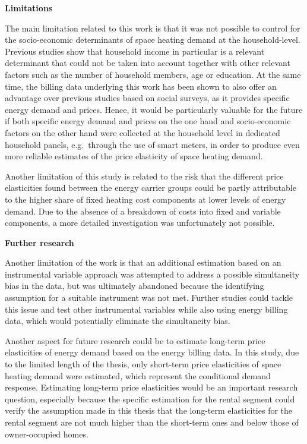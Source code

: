 \documentclass[12pt,twoside]{reedthesis}
\begin{document}
\textbf{Limitations}

The main limitation related to this work is that it was not possible to control for the socio-economic determinants of space heating demand at the household-level. Previous studies show that household income in particular is a relevant determinant that could not be taken into account together with other relevant factors such as the number of household members, age or education. At the same time, the billing data underlying this work has been shown to also offer an advantage over previous studies based on social surveys, as it provides specific energy demand and prices. Hence, it would be particularly valuable for the future if both specific energy demand and prices on the one hand and socio-economic factors on the other hand were collected at the household level in dedicated household panels, e.g.~through the use of smart meters, in order to produce even more reliable estimates of the price elasticity of space heating demand.

Another limitation of this study is related to the risk that the different price elasticities found between the energy carrier groups could be partly attributable to the higher share of fixed heating cost components at lower levels of energy demand. Due to the absence of a breakdown of costs into fixed and variable components, a more detailed investigation was unfortunately not possible.

\textbf{Further research}

Another limitation of the work is that an additional estimation based on an instrumental variable approach was attempted to address a possible simultaneity bias in the data, but was ultimately abandoned because the identifying assumption for a suitable instrument was not met. Further studies could tackle this issue and test other instrumental variables while also using energy billing data, which would potentially eliminate the simultaneity bias.

Another aspect for future research could be to estimate long-term price elasticities of energy demand based on the energy billing data. In this study, due to the limited length of the thesis, only short-term price elasticities of space heating demand were estimated, which represent the conditional demand response. Estimating long-term price elasticities would be an important research question, especially because the specific estimation for the rental segment could verify the assumption made in this thesis that the long-term elasticities for the rental segment are not much higher than the short-term ones and below those of owner-occupied homes.
\end{document}
